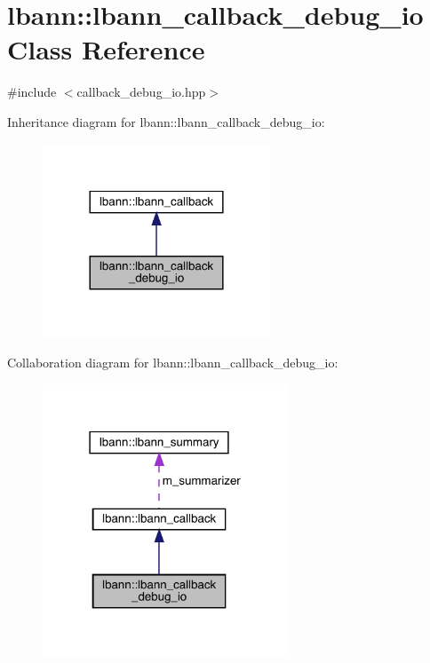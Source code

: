 \hypertarget{classlbann_1_1lbann__callback__debug__io}{}\section{lbann\+:\+:lbann\+\_\+callback\+\_\+debug\+\_\+io Class Reference}
\label{classlbann_1_1lbann__callback__debug__io}


{\ttfamily \#include $<$callback\+\_\+debug\+\_\+io.\+hpp$>$}



Inheritance diagram for lbann\+:\+:lbann\+\_\+callback\+\_\+debug\+\_\+io\+:\nopagebreak
\begin{figure}[H]
\begin{center}
\leavevmode
\includegraphics[width=192pt]{classlbann_1_1lbann__callback__debug__io__inherit__graph}
\end{center}
\end{figure}


Collaboration diagram for lbann\+:\+:lbann\+\_\+callback\+\_\+debug\+\_\+io\+:\nopagebreak
\begin{figure}[H]
\begin{center}
\leavevmode
\includegraphics[width=207pt]{classlbann_1_1lbann__callback__debug__io__coll__graph}
\end{center}
\end{figure}

